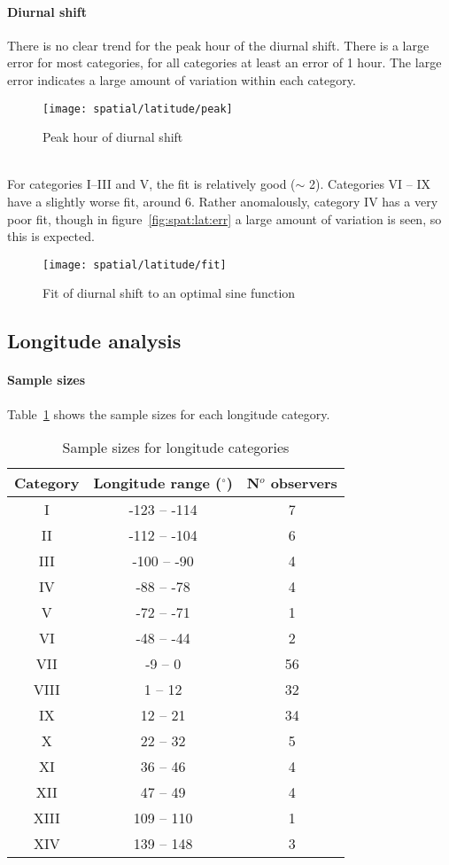 \paragraph{Diurnal shift\\}
There is no clear trend for the peak hour of the diurnal shift. There is a large error for most categories, for all categories at least an error of 1 hour. The large error indicates a large amount of variation within each category.
\begin{figure}[h!]
	\centering
	\texttt{[image: spatial/latitude/peak]}
	\caption{Peak hour of diurnal shift
		\label{fig:spat:lat:peak}}
\end{figure}\\
For categories I--III and V, the fit is relatively good ($\sim$ 2). Categories VI -- IX have a slightly worse fit, around 6. Rather anomalously, category IV has a very poor fit, though in figure~\ref{fig:spat:lat:err} a large amount of variation is seen, so this is expected.
\begin{figure}[h!]
	\centering
	\texttt{[image: spatial/latitude/fit]}
	\caption{Fit of diurnal shift to an optimal sine function
		\label{fig:spat:lat:fit}}
\end{figure}

\subsection{Longitude analysis}

\paragraph{Sample sizes\\}
Table~\ref{tab:spat:long} shows the sample sizes for each longitude category.
\begin{table}[h!]
	\centering
\begin{tabular}{ccc}
	\hline 
	Category & Longitude range ($^{\circ}$) & N$^o$ observers \\ 
	\hline 
	I & -123 -- -114 & 7 \\ 
	II & -112 -- -104 & 6 \\ 
	III & -100 -- -90 & 4 \\ 
	IV & -88 -- -78 & 4 \\ 
	V & -72 -- -71 & 1 \\ 
	VI & -48 -- -44 & 2 \\ 
	VII & -9 -- 0 & 56 \\ 
	VIII & 1 -- 12 & 32 \\ 
	IX & 12 -- 21 & 34 \\ 
	X & 22 -- 32 & 5 \\ 
	XI & 36 -- 46 & 4 \\ 
	XII & 47 -- 49 & 4 \\  
	XIII & 109 -- 110 & 1 \\ 
	XIV & 139 -- 148 & 3 \\  
	\hline
\end{tabular} 
\caption{Sample sizes for longitude categories \label{tab:spat:long}}
\end{table}

